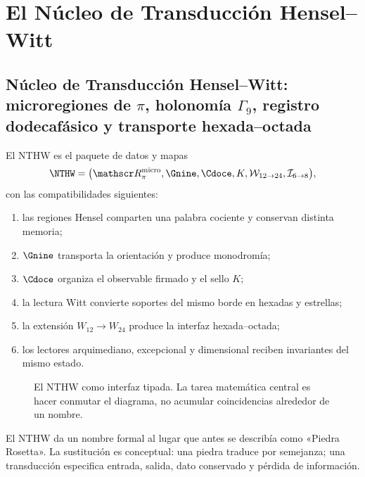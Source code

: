 \label{chap:83-12}

\section{El Núcleo de Transducción Hensel--Witt}
\label{p12-83-c12-s1:chap:nthw}


\subsection{Núcleo de Transducción Hensel–Witt: microregiones de \(\pi\), holonomía \(\Gamma_9\), registro dodecafásico y transporte hexada–octada}

El NTHW es el paquete de datos y mapas
\[
\NTHW=
\bigl(
\mathscr R_\pi^{\rm micro},
\Gnine,
\Cdoce,
K,
\mathcal W_{12\to24},
\mathcal I_{6\to8}
\bigr),
\]
con las compatibilidades siguientes:
\begin{enumerate}
  \item las regiones Hensel comparten una palabra cociente y conservan
  distinta memoria;
  \item \(\Gnine\) transporta la orientación y produce monodromía;
  \item \(\Cdoce\) organiza el observable firmado y el sello \(K\);
  \item la lectura Witt convierte soportes del mismo borde en hexadas y
  estrellas;
  \item la extensión \(W_{12}\to W_{24}\) produce la interfaz
  hexada--octada;
  \item los lectores arquimediano, excepcional y dimensional reciben
  invariantes del mismo estado.
\end{enumerate}

\begin{figure}[p]
\centering
\resizebox{\textwidth}{!}{}
\caption{El NTHW como interfaz tipada. La tarea matemática central es hacer
conmutar el diagrama, no acumular coincidencias alrededor de un nombre.}
\label{p12-83-c12-s1:fig:nthw}
\end{figure}

El NTHW da un nombre formal al lugar que antes se describía como «Piedra
Rosetta». La sustitución es conceptual: una piedra traduce por semejanza; una
transducción especifica entrada, salida, dato conservado y pérdida de
información.

